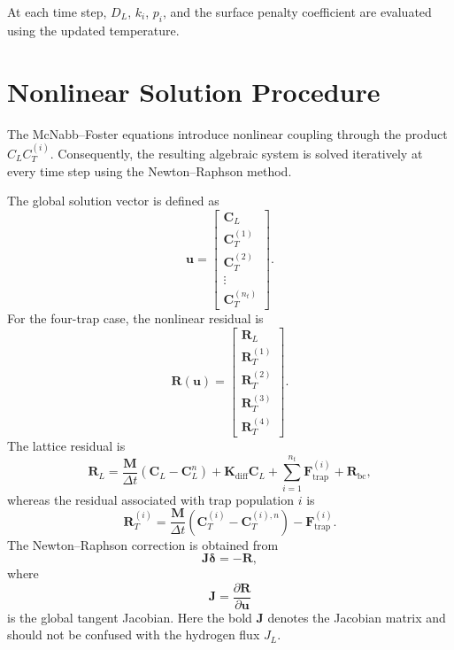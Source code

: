 \documentclass[a4paper,12pt,oneside]{report}
\begin{document}
At each time step, $D_L$, $k_i$, $p_i$, and the surface penalty coefficient are evaluated using the updated temperature.

\section{Nonlinear Solution Procedure}
\label{sec:ch3_nonlinear}

The McNabb--Foster equations introduce nonlinear coupling through the product $C_LC_T^{(i)}$. Consequently, the resulting algebraic system is solved iteratively at every time step using the Newton--Raphson method.

The global solution vector is defined as
\begin{equation}
\mathbf{u}
=
\begin{bmatrix}
\mathbf{C}_L\\
\mathbf{C}_T^{(1)}\\
\mathbf{C}_T^{(2)}\\
\vdots\\
\mathbf{C}_T^{(n_t)}
\end{bmatrix}.
\end{equation}
For the four-trap case, the nonlinear residual is
\begin{equation}
\mathbf{R}(\mathbf{u})
=
\begin{bmatrix}
\mathbf{R}_L\\
\mathbf{R}_T^{(1)}\\
\mathbf{R}_T^{(2)}\\
\mathbf{R}_T^{(3)}\\
\mathbf{R}_T^{(4)}
\end{bmatrix}.
\end{equation}
The lattice residual is
\begin{equation}
\mathbf{R}_L
=
\frac{\mathbf{M}}{\Delta t}
\left(
\mathbf{C}_L-\mathbf{C}_L^{n}
\right)
+
\mathbf{K}_{\mathrm{diff}}\mathbf{C}_L
+
\sum_{i=1}^{n_t}
\mathbf{F}_{\mathrm{trap}}^{(i)}
+
\mathbf{R}_{\mathrm{bc}},
\label{eq:ch3_RL}
\end{equation}
whereas the residual associated with trap population $i$ is
\begin{equation}
\mathbf{R}_T^{(i)}
=
\frac{\mathbf{M}}{\Delta t}
\left(
\mathbf{C}_T^{(i)}
-
\mathbf{C}_T^{(i),n}
\right)
-
\mathbf{F}_{\mathrm{trap}}^{(i)}.
\label{eq:ch3_RT}
\end{equation}
The Newton--Raphson correction is obtained from
\begin{equation}
\mathbf{J}
\boldsymbol{\delta}
=
-\mathbf{R},
\label{eq:ch3_newton}
\end{equation}
where
\begin{equation}
\mathbf{J}
=
\frac{\partial\mathbf{R}}
{\partial\mathbf{u}}
\end{equation}
is the global tangent Jacobian. Here the bold $\mathbf{J}$ denotes the Jacobian matrix and should not be confused with the hydrogen flux $J_L$.
\end{document}
